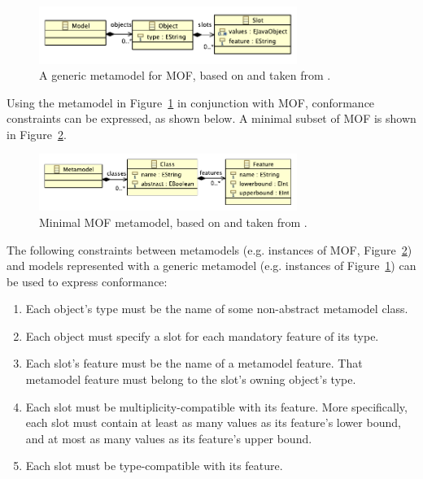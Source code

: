 \begin{figure}[htbp]
  \centering
  \includegraphics[width=3.3in]{5.Implementation/slot_model.pdf}
  \caption[A generic metamodel for MOF]{A generic metamodel for MOF, based on \cite{mof} and taken from \cite{rose09enhanced}.}
  \label{fig:slot_model}
\end{figure}

Using the metamodel in Figure~\ref{fig:slot_model} in conjunction with MOF, conformance constraints can be expressed, as shown below. A minimal subset of MOF is shown in Figure~\ref{fig:minimal_mof}.

\begin{figure}[htbp]
  \centering
  \includegraphics[width=3.3in]{5.Implementation/mof.pdf}
  \caption[Minimal MOF metamodel]{Minimal MOF metamodel, based on \cite{mof} and taken from \cite{rose09enhanced}.}
  \label{fig:minimal_mof}
\end{figure}

The following constraints between metamodels (e.g. instances of MOF, Figure~\ref{fig:minimal_mof}) and models represented with a generic metamodel (e.g. instances of Figure~\ref{fig:slot_model}) can be used to express conformance:

\begin{enumerate}
	\item Each object's type must be the name of some non-abstract metamodel class.
	\item Each object must specify a slot for each mandatory feature of its type.
	\item Each slot's feature must be the name of a metamodel feature. That metamodel feature must belong to the slot's owning object's type.
	\item Each slot must be multiplicity-compatible with its feature. More specifically, each slot must contain at least as many values as its feature's lower bound, and at most as many values as its feature's upper bound.
  \item Each slot must be type-compatible with its feature.
\end{enumerate}

